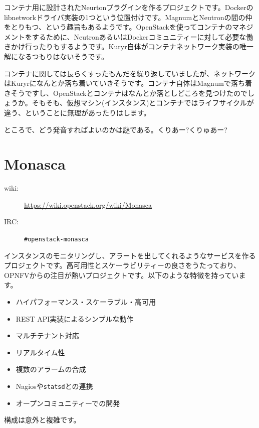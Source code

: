 コンテナ用に設計されたNeurtonプラグインを作るプロジェクトです。Dockerのlibnetworkドライバ実装の1つという位置付けです。MagnumとNeutronの間の仲をとりもつ、という趣旨もあるようです。OpenStackを使ってコンテナのマネジメントをするために、NeutronあるいはDockerコミュニティーに対して必要な働きかけ行ったりもするようです。Kuryr自体がコンテナネットワーク実装の唯一解になるつもりはないそうです。

コンテナに関しては長らくすったもんだを繰り返していましたが、ネットワークはKuryrになんとか落ち着いていきそうです。コンテナ自体はMagnumで落ち着きそうですし、OpenStackとコンテナはなんとか落としどころを見つけたのでしょうか。そもそも、仮想マシン(インスタンス)とコンテナではライフサイクルが違う、ということに無理があったりはします。

ところで、どう発音すればよいのかは謎である。くりあー?くりゅあー?

\section{Monasca}

\begin{description}
	\item[wiki:] \url{https://wiki.openstack.org/wiki/Monasca}
	\item[IRC:] \verb|#openstack-monasca|
\end{description}

インスタンスのモニタリングし、アラートを出してくれるようなサービスを作るプロジェクトです。高可用性とスケーラビリティーの良さをうたっており、OPNFVからの注目が熱いプロジェクトです。以下のような特徴を持っています。

\begin{itemize}
	\item ハイパフォーマンス・スケーラブル・高可用
	\item REST API実装によるシンプルな動作
	\item マルチテナント対応
	\item リアルタイム性
	\item 複数のアラームの合成
	\item Nagiosや\verb|statsd|との連携
	\item オープンコミュニティーでの開発
\end{itemize}

構成は意外と複雑です。

